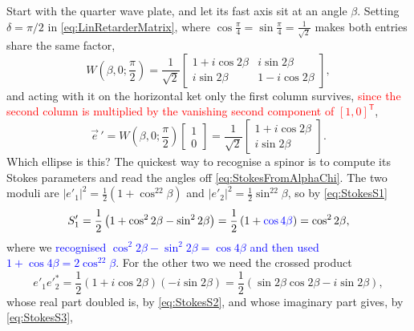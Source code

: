             Start with the quarter wave plate, and let its fast axis sit at an angle $\beta$. Setting $\delta=\pi/2$ in \ref{eq:LinRetarderMatrix}, where $\cos\frac{\pi}{4}=\sin\frac{\pi}{4}=\frac{1}{\sqrt{2}}$ makes both entries share the same factor,
            \begin{equation}\label{eq:QWPatBeta}
                W\left(\beta,0;\frac{\pi}{2}\right) = \frac{1}{\sqrt{2}}\begin{bmatrix} 1+i\cos2\beta & i\sin2\beta \\ i\sin2\beta & 1-i\cos2\beta \end{bmatrix},
            \end{equation}
            and acting with it on the horizontal ket only the first column survives, \textcolor{red}{since the second column is multiplied by the vanishing second component of $\left[1,0\right]^{\mathsf{T}}$},
            \begin{equation}\label{eq:QWPonHorizontalSpinor}
                \vec{e}\,' = W\left(\beta,0;\frac{\pi}{2}\right)\begin{bmatrix}1\\0\end{bmatrix} = \frac{1}{\sqrt{2}}\begin{bmatrix} 1+i\cos2\beta \\ i\sin2\beta \end{bmatrix}.
            \end{equation}
            Which ellipse is this? The quickest way to recognise a spinor is to compute its Stokes parameters and read the angles off \ref{eq:StokesFromAlphaChi}. The two moduli are $\left|e'_1\right|^2=\frac{1}{2}\left(1+\cos^22\beta\right)$ and $\left|e'_2\right|^2=\frac{1}{2}\sin^22\beta$, so by \ref{eq:StokesS1}
            \begin{equation*}
                S'_1 = \frac{1}{2}\left(1+\cos^22\beta-\sin^22\beta\right) = \frac{1}{2}\left(1+\textcolor{blue}{\cos4\beta}\right) = \cos^22\beta,
            \end{equation*}
            where we \textcolor{blue}{recognised $\cos^2 2\beta-\sin^2 2\beta=\cos4\beta$ and then used $1+\cos4\beta=2\cos^22\beta$}. For the other two we need the crossed product
            \begin{equation*}
                e'_1e'^{*}_2 = \frac{1}{2}\left(1+i\cos2\beta\right)\left(-i\sin2\beta\right) = \frac{1}{2}\left(\sin2\beta\cos2\beta-i\sin2\beta\right),
            \end{equation*}
            whose real part doubled is, by \ref{eq:StokesS2}, and whose imaginary part gives, by \ref{eq:StokesS3},
